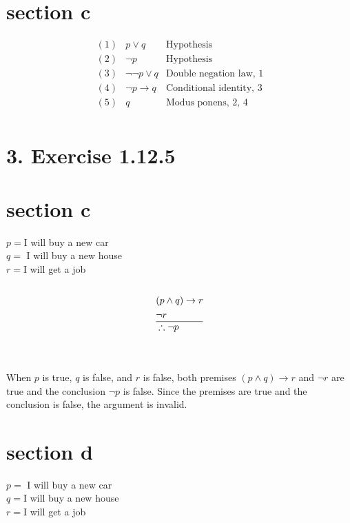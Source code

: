 \documentclass[10pt]{article}
\begin{document}
\section*{section c}
\[
\begin{array}{rrr}
(1) & p \vee q & \text{Hypothesis}\\
(2) & \neg p & \text{Hypothesis}\\
(3) & \neg \neg p \vee q & \text{Double negation law, 1}\\
(4) & \neg p \rightarrow q & \text{Conditional identity, 3}\\ 
(5) & q & \text{Modus ponens, 2, 4}\\
\end{array}
\]

\section*{3. Exercise 1.12.5}
\section*{section c}
$p=\mathrm{I}$ will buy a new car\\
$q=$ I will buy a new house\\
$r=\mathrm{I}$ will get a job\\

 \\

$$
\begin{aligned}
& (p \wedge q) \rightarrow r \\
& \neg r \\
\hline
& \therefore \neg p
\end{aligned}
$$

 \\

 \\

{When $p$ is true, $q$ is false, and $r$ is false, both premises $(p \wedge q) \rightarrow r$ and $\neg r$ are true and the conclusion $\neg p$ is false. Since the premises are true and the conclusion is false, the argument is invalid.} \\

\section*{section d}
$p=$ I will buy a new car\\
$q=\mathrm{I}$ will buy a new house\\
$r=\mathrm{I}$ will get a job\\
\end{document}
